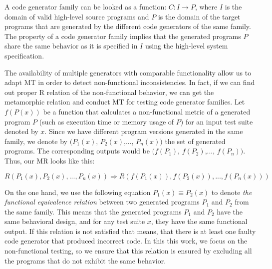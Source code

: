 A code generator family can be looked as a function: $C : I \rightarrow P$, where $I$ is the domain of valid high-level source programs and $P$ is the domain of the target programs that are generated by the different code generators of the same family. The property of a code generator family implies that the generated programs $P$ share the same behavior as it is specified in $I$ using the high-level system specification. 


The availability of multiple generators with comparable functionality allow us to adapt MT in order to detect non-functional inconsistencies. In fact, if we can find out proper R relation of the non-functional behavior, we can get the metamorphic relation and conduct MT for testing code generator families.
Let $f(P(x))$ be a function that calculates a non-functional metric of a generated program $P$ (such as execution time or memory usage of $P$) for an input test suite denoted by $x$. Since we have different program versions generated in the same family, we denote by $(P_{1}(x)$, $P_{2}(x)$,..., $P_{n}(x))$ the set of generated programs. The corresponding outputs would be $(f(P_{1})$, $f(P_{2})$,..., $f(P_{n}))$. Thus, our MR looks like this:

\begin{equation}
	 R(P_{1}(x), P_{2}(x),..., P_{n}(x))  \Rightarrow R(f(P_{1}(x)), f(P_{2}(x)),..., f(P_{n}(x)))
\end{equation}

On the one hand, we use the following equation $P_{1}(x) \equiv P_{2}(x)$ to denote \textit{the functional equivalence relation} between two generated programs $P_{1}$ and $P_{2}$ from the same family. This means that the generated programs $P_{1}$ and $P_{2}$ have the same behavioral design, and for any test suite $x$, they have the same functional output. 
If this relation is not satisfied that means, that there is at least one faulty code generator that produced incorrect code. In this this work, we focus on the non-functional testing, so we ensure that this relation is ensured by excluding all the programs that do not exhibit the same behavior. 


